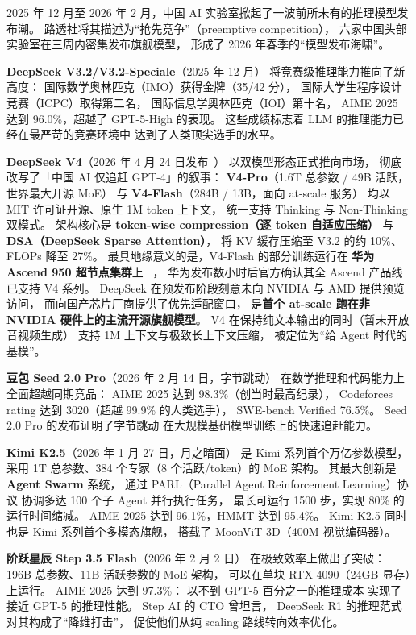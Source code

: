 2025 年 12 月至 2026 年 2 月，中国 AI 实验室掀起了一波前所未有的推理模型发布潮。
路透社将其描述为“抢先竞争”（preemptive competition），
六家中国头部实验室在三周内密集发布旗舰模型，
形成了 2026 年春季的“模型发布海啸”。

\textbf{DeepSeek V3.2/V3.2-Speciale}（2025 年 12 月）
将竞赛级推理能力推向了新高度：
国际数学奥林匹克（IMO）获得金牌（35/42 分），
国际大学生程序设计竞赛（ICPC）取得第二名，
国际信息学奥林匹克（IOI）第十名，
AIME 2025 达到 96.0\%，超越了 GPT-5-High 的表现。
这些成绩标志着 LLM 的推理能力已经在最严苛的竞赛环境中
达到了人类顶尖选手的水平。

\textbf{DeepSeek V4}（2026 年 4 月 24 日发布~\cite{deepseek_v4_release_2026}）
以双模型形态正式推向市场，
彻底改写了「中国 AI 仅追赶 GPT-4」的叙事：
\textbf{V4-Pro}（1.6T 总参数 / 49B 活跃，世界最大开源 MoE）
与 \textbf{V4-Flash}（284B / 13B，面向 at-scale 服务）
均以 MIT 许可证开源、原生 1M token 上下文，
统一支持 Thinking 与 Non-Thinking 双模式。
架构核心是
\textbf{token-wise compression（逐 token 自适应压缩）}
与 \textbf{DSA（DeepSeek Sparse Attention）}，
将 KV 缓存压缩至 V3.2 的约 10\%、FLOPs 降至 27\%。
最具地缘意义的是，V4-Flash 的部分训练运行在
\textbf{华为 Ascend 950 超节点集群}上%
~\cite{deepseek_v4_huawei_2026}，
华为发布数小时后官方确认其全 Ascend 产品线已支持 V4 系列。
DeepSeek 在预发布阶段刻意未向 NVIDIA 与 AMD 提供预览访问，
而向国产芯片厂商提供了优先适配窗口，
是\textbf{首个 at-scale 跑在非 NVIDIA 硬件上的主流开源旗舰模型}。
V4 在保持纯文本输出的同时（暂未开放音视频生成）
支持 1M 上下文与极致长上下文压缩，
被定位为“给 Agent 时代的基模”。

\textbf{豆包 Seed 2.0 Pro}（2026 年 2 月 14 日，字节跳动）
在数学推理和代码能力上全面超越同期竞品：
AIME 2025 达到 98.3\%（创当时最高纪录），
Codeforces rating 达到 3020（超越 99.9\% 的人类选手），
SWE-bench Verified 76.5\%。
Seed 2.0 Pro 的发布证明了字节跳动
在大规模基础模型训练上的快速追赶能力。

\textbf{Kimi K2.5}（2026 年 1 月 27 日，月之暗面）
是 Kimi 系列首个万亿参数模型，
采用 1T 总参数、384 个专家（8 个活跃/token）的 MoE 架构。
其最大创新是 \textbf{Agent Swarm} 系统，
通过 PARL（Parallel Agent Reinforcement Learning）协议
协调多达 100 个子 Agent 并行执行任务，
最长可运行 1500 步，实现 80\% 的运行时间缩减。
AIME 2025 达到 96.1\%，HMMT 达到 95.4\%。
Kimi K2.5 同时也是 Kimi 系列首个多模态旗舰，
搭载了 MoonViT-3D（400M 视觉编码器）。

\textbf{阶跃星辰 Step 3.5 Flash}（2026 年 2 月 2 日）
在极致效率上做出了突破：
196B 总参数、11B 活跃参数的 MoE 架构，
可以在单块 RTX 4090（24GB 显存）上运行。
AIME 2025 达到 97.3\%：
以不到 GPT-5 百分之一的推理成本
实现了接近 GPT-5 的推理性能。
Step AI 的 CTO 曾坦言，
DeepSeek R1 的推理范式对其构成了“降维打击”，
促使他们从纯 scaling 路线转向效率优化。

